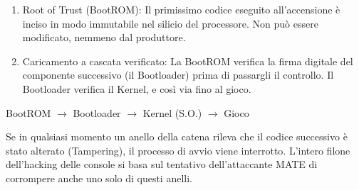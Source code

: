 \begin{enumerate}
\item Root of Trust (BootROM): Il primissimo codice eseguito all'accensione è inciso in modo immutabile nel silicio del processore. Non può essere modificato, nemmeno dal produttore.
\item Caricamento a cascata verificato: La BootROM verifica la firma digitale del componente successivo (il Bootloader) prima di passargli il controllo. Il Bootloader verifica il Kernel, e così via fino al gioco.
\end{enumerate}

\begin{center}
BootROM  \(\to\)  Bootloader  \(\to\)  Kernel (S.O.)  \(\to\)  Gioco
\end{center}

Se in qualsiasi momento un anello della catena rileva che il codice successivo è stato alterato (Tampering), il processo di avvio viene interrotto. L'intero filone dell'hacking delle console si basa sul tentativo dell'attaccante MATE di corrompere anche uno solo di questi anelli.